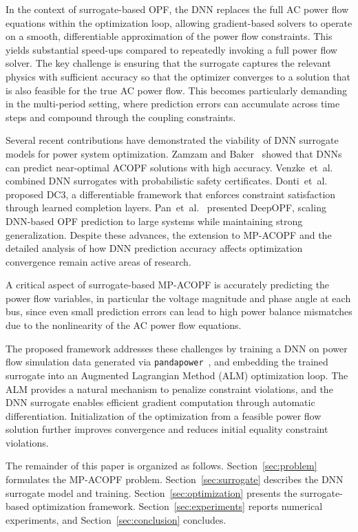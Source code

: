 \documentclass[journal]{IEEEtran}
\begin{document}
In the context of surrogate-based OPF, the DNN replaces the full AC power flow
equations within the optimization loop, allowing gradient-based solvers to operate
on a smooth, differentiable approximation of the power flow constraints. This
yields substantial speed-ups compared to repeatedly invoking a full power flow
solver. The key challenge is ensuring that the surrogate captures the relevant
physics with sufficient accuracy so that the optimizer converges to a solution
that is also feasible for the true AC power flow. This becomes particularly
demanding in the multi-period setting, where prediction errors can accumulate
across time steps and compound through the coupling constraints.

Several recent contributions have demonstrated the viability of DNN surrogate
models for power system optimization. Zamzam and Baker~\cite{zamzam2020learning}
showed that DNNs can predict near-optimal ACOPF solutions with high accuracy.
Venzke~et~al.~\cite{venzke2020learning} combined DNN surrogates with probabilistic
safety certificates. Donti~et~al.~\cite{donti2021dc3} proposed DC3, a
differentiable framework that enforces constraint satisfaction through learned
completion layers. Pan~et~al.~\cite{pan2023deepopf} presented DeepOPF, scaling
DNN-based OPF prediction to large systems while maintaining strong generalization.
Despite these advances, the extension to MP-ACOPF and the detailed analysis of
how DNN prediction accuracy affects optimization convergence remain active areas
of research.

A critical aspect of surrogate-based MP-ACOPF is accurately predicting the power
flow variables, in particular the voltage magnitude and phase angle at each bus,
since even small prediction errors can lead to high power balance mismatches due
to the nonlinearity of the AC power flow equations.

The proposed framework addresses these challenges by training a DNN on power flow
simulation data generated via \texttt{pandapower}~\cite{thurner2018pandapower},
and embedding the trained surrogate into an Augmented Lagrangian Method (ALM)
optimization loop. The ALM provides a natural mechanism to penalize constraint
violations, and the DNN surrogate enables efficient gradient computation through
automatic differentiation. Initialization of the optimization from a feasible
power flow solution further improves convergence and reduces initial equality
constraint violations.

The remainder of this paper is organized as follows.
Section~\ref{sec:problem} formulates the MP-ACOPF problem.
Section~\ref{sec:surrogate} describes the DNN surrogate model and training.
Section~\ref{sec:optimization} presents the surrogate-based optimization framework.
Section~\ref{sec:experiments} reports numerical experiments, and
Section~\ref{sec:conclusion} concludes.
\end{document}
